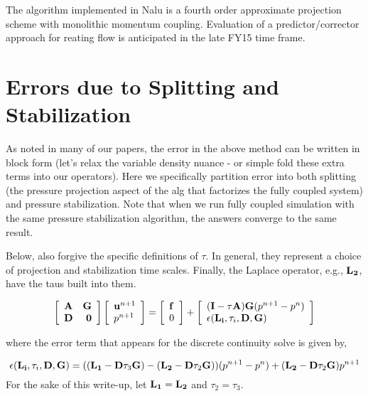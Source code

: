The algorithm implemented in Nalu is a fourth order approximate projection scheme
with monolithic momentum coupling. Evaluation of a predictor/corrector approach
for reating flow is anticipated in the late FY15 time frame.

\section{Errors due to Splitting and Stabilization}

As noted in many of our papers, the error in the above
method can be written in block form (let's relax the variable
density nuance - or simple fold these extra terms into 
our operators). Here we specifically partition error into
both splitting (the pressure projection aspect of the alg that
factorizes the fully coupled system) and pressure stabilization. 
Note that when we run fully coupled simulation with the same
pressure stabilization algorithm, the answers converge to the
same result.

Below, also forgive the specific definitions of $\tau$. In general,
they represent a choice of projection and stabilization
time scales. Finally, the Laplace operator, e.g., ${\bf L_2}$, have the
taus built into them.

\begin{equation}
  \left[
    \begin{array}{lr}
      {\bf A}  &  {\bf G}  \\
      {\bf D}  &  {\bf 0}
    \end{array}
  \right]
%
  \left[
    \begin{array}{l}
      {\bf u}^{n+1}  \\
      p^{n+1} 
    \end{array}
  \right] =
%
  \left[
    \begin{array}{l}
      {\bf f}  \\
      0
    \end{array}
  \right]    + 
   \left[
    \begin{array}{l}
      ({\bf I}- \tau {\bf A } ){\bf G}(p^{n+1}-p^n) \\ 
      \epsilon({\bf L_i},\tau_i, {\bf D}, {\bf G})
  \end{array}
  \right] 
     \label{smoothSplitError}
\end{equation}


\noindent
where the error term that appears for the discrete continuity solve is given
by,

\begin{equation}
\epsilon({\bf L_i},\tau_i,{\bf D},{\bf G}) = (({\bf L_1}-{\bf D}\tau_3{\bf G}) \\ -({\bf L_2}-{\bf D}\tau_2{\bf G}))(p^{n+1}-p^{n}) \\ + ({\bf L_2}-{\bf D}\tau_2{\bf G})p^{n+1}
\label{contErrorDefined}
\end{equation}
%
For the sake of this write-up, let ${\bf L_1} = {\bf L_2}$ and 
$\tau_2 = \tau_3$.
